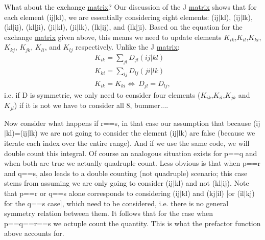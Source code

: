 What about the exchange \hyperlink{classJKBuilder_1_1matrix}{matrix}? Our discussion of the J \hyperlink{classJKBuilder_1_1matrix}{matrix} shows that for each element (ij$|$kl), we are essentially considering eight elements: (ij$|$kl), (ij$|$lk), (kl$|$ij), (kl$|$ji), (ji$|$kl), (ji$|$lk), (lk$|$ij), and (lk$|$ji). Based on the equation for the exchange \hyperlink{classJKBuilder_1_1matrix}{matrix} given above, this means we need to update elements $K_{ik}$,$K_{il}$,$K_{ki}$, $K_{kj}$, $K_{jk}$, $K_{li}$, and $K_{lj}$ respectively. Unlike the J \hyperlink{classJKBuilder_1_1matrix}{matrix}: \begin{eqnarray*} K_{ik}=\sum_{jl}D_{jl}(ij|kl)\\ K_{ki}=\sum_{lj}D_{lj}(ji|lk)\\ K_{ik}=K_{ki} \iff\ D_{jl}=D_{lj}, \end{eqnarray*} i.e. if D is symmetric, we only need to consider four elements ($K_{ik}$,$K_{il}$,$K_{jk}$ and $K_{jl}$) if it is not we have to consider all 8, bummer....

Now consider what happens if r==s, in that case our assumption that because (ij$|$kl)=(ij$|$lk) we are not going to consider the element (ij$|$lk) are false (because we iterate each index over the entire range). And if we use the same code, we will double count this integral. Of course an analogous situation exists for p==q and when both are true we actually quadruple count. Less obvious is that when p==r and q==s, also leads to a double counting (not quadruple) scenario; this case stems from assuming we are only going to consider (ij$|$kl) and not (kl$|$ij). Note that p==r or q==s alone corresponds to considering (ij$|$kl) and (kj$|$il) \mbox{[}or (il$|$kj) for the q==s case\mbox{]}, which need to be considered, i.e. there is no general symmetry relation between them. It follows that for the case when p==q==r==s we octuple count the quantity. This is what the prefactor function above accounts for.

